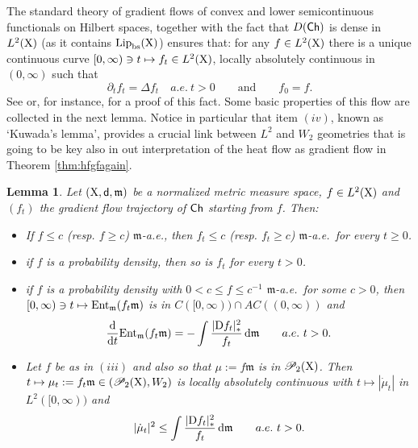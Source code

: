 \documentclass[11pt]{article}
\numberwithin{equation}{section}
\newtheorem{lemma}[theorem]{Lemma}
\newcommand{\prd}{\mathscr P_2}
\newcommand{\X}{{\rm X}}
\newcommand{\sfd}{{\sf d}}
\newcommand{\mm}{{\mathfrak m}}
\newcommand{\ch}{{\sf Ch}}
\newcommand{\ent}{{\rm Ent}_\mm}
\renewcommand{\d}{{\rm d}}
\newcommand{\D}{{\rm D}}
\newcommand{\Lip}{{\rm Lip}}
\newcommand{\bs}{{\rm bs}}
\begin{document}
The standard theory of gradient flows of convex and lower semicontinuous functionals on Hilbert spaces, together with the fact that $D(\ch)$ is dense in $L^2(\X)$ (as it contains $\Lip_\bs(\X)$) ensures that: for any $f\in L^2(\X)$ there is a unique continuous curve $[0,\infty)\ni t\mapsto f_t\in L^2(\X)$, locally absolutely continuous in $(0,\infty)$ such that 
\begin{equation}
\label{eq:gfch}
\partial_tf_t=\Delta f_t\quad a.e.\ t>0\qquad\text{and}\qquad f_0=f.
\end{equation}
See \cite[Chapter 7]{Brezis11} or, for instance, \cite[Theorem 5.1.12]{GP19} for a proof of this fact. Some basic properties of this flow are collected in the next lemma. Notice in particular that item $(iv)$, known as `Kuwada's lemma', provides a crucial link between $L^2$ and $W_2$ geometries that is going to be key also in out interpretation of the heat flow as gradient flow in Theorem \ref{thm:hfgfagain}.
\begin{lemma}\label{le:basegfch}
Let $(\X,\sfd,\mm)$ be a normalized metric measure space, $f\in L^2(\X)$ and $(f_t)$ the gradient flow trajectory of $\ch$ starting from $f$. Then:
\begin{itemize}
\item[i)] If $f\leq c$ (resp. $f\geq c$) $\mm$-a.e., then $f_t\leq c$ (resp. $f_t\geq c$) $\mm$-a.e.\ for every $t\geq 0$.
\item[ii)] if $f$ is a probability density, then so is $f_t$ for every $t>0$.
\item[iii)] if $f$ is a probability density with $0<c\leq f\leq c^{-1} $ $\mm$-a.e.\ for some $c>0$, then $[0,\infty)\ni t \mapsto \ent{(f_t\mm)}$ is in $C([0,\infty))\cap AC((0,\infty))$ and
\[
\frac\d{\d t}\ent{(f_t\mm)}=-\int\frac{|\D f_t|^2_*}{f_t}\,\d\mm\qquad a.e.\ t>0.
\]
\item[iv)] Let $f$ be as in $(iii)$ and also so that $\mu:=f\mm$ is in $\prd(\X)$. Then $t\mapsto \mu_t:=f_t\mm\in(\prd(\X),W_2)$ is locally absolutely  continuous with $t\mapsto|\dot\mu_t|$ in $L^2([0,\infty))$ and
\begin{equation}
\label{eq:kuwlem}
|\dot\mu_t|^2\leq \int\frac{|\D f_t|_*^2}{f_t}\,\d\mm\qquad a.e.\ t>0.
\end{equation}
\end{itemize}
\end{lemma}
\end{document}
